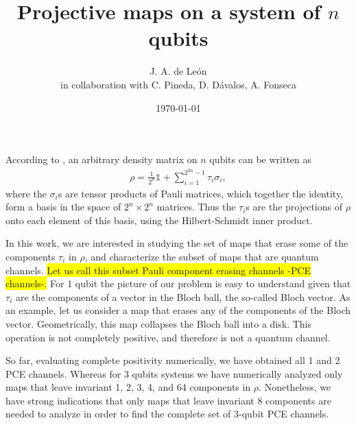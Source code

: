 \documentclass[11pt,dvipsnames]{article} %
\newcommand{\pce}{PCE}
\newcommand{\h}[1]{\colorbox{Yellow}{#1}}
\newcommand{\1}{\mathds{1}}
\begin{document}
\title{Projective maps on a system of $n$ qubits} 
\author{J. A. de León\\ \small{in collaboration with C. Pineda, D. Dávalos, A. Fonseca}}


\date{\today}  

\maketitle
According to \cite{bengtsson_zyczkowski_2017}, an arbitrary density matrix on $n$  
qubits can be written as
\begin{align}
  \rho = \frac{1}{2^n}\1 + \sum _{i=1}^{2^{2n}-1}\tau _i\sigma _i,
	\label{rho}
\end{align}
where the $\sigma _i$s are tensor products of Pauli 
matrices, which together the identity, form a basis in the space of $2^n\times 2^n$ matrices. Thus the 
$\tau_i$s are the projections of $\rho$ onto each element of this basis, using the Hilbert-Schmidt inner product.

In this work, we are interested in studying the set of maps that erase
some of the components $\tau_i$ in $\rho$, and characterize the subset of maps
that are quantum channels.
\h{Let us call this subset Pauli component erasing
channels -\pce{} channels-.}
For 1 qubit the picture of our problem is easy to understand given that 
$\tau_i$ are the components of a vector in the Bloch ball, the so-called
Bloch vector. As an example, let us consider a map that erases any of the 
components of the Bloch vector. Geometrically, this map collapses 
the Bloch ball into a disk. This operation is not completely positive, and therefore is not a quantum channel.  

So far, evaluating complete positivity numerically, we have obtained all 1 and 2 \pce{} channels. Whereas for $3$ qubits systems we have numerically analyzed only maps that leave 
invariant 1, 2, 3, 4, and 64 components in $\rho$. Nonetheless, we have strong
indications that only maps that leave invariant 8 components are 
needed to analyze in order to find the complete set of 3-qubit PCE 
channels.
\end{document}
